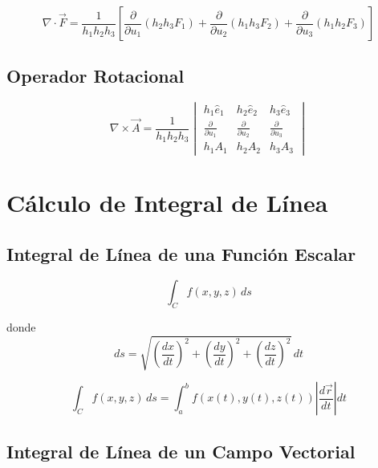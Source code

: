 \documentclass[12pt,a4paper,twocolumn]{article}
\begin{document}
\begin{equation*}
    \nabla \cdot \vec{F} = \frac{1}{h_1 h_2 h_3} \left[ \frac{\partial}{\partial u_1}(h_2 h_3 F_1) + \frac{\partial}{\partial u_2}(h_1 h_3 F_2) + \frac{\partial}{\partial u_3}(h_1 h_2 F_3) \right]
\end{equation*}

\subsection*{Operador Rotacional}

\begin{equation*}
    \nabla \times \vec{A} = \frac{1}{h_1 h_2 h_3}
    \begin{vmatrix}
        h_1 \hat{e}_1                 & h_2 \hat{e}_2                 & h_3 \hat{e}_3                 \\
        \frac{\partial}{\partial u_1} & \frac{\partial}{\partial u_2} & \frac{\partial}{\partial u_3} \\
        h_1 A_1                       & h_2 A_2                       & h_3 A_3
    \end{vmatrix}
\end{equation*}

\section*{Cálculo de Integral de Línea}

\subsection*{Integral de Línea de una Función Escalar}

\begin{equation*}
    \int_C f(x, y, z) \, ds
\end{equation*}

donde
\begin{equation*}
    ds = \sqrt{\left(\frac{dx}{dt}\right)^2 + \left(\frac{dy}{dt}\right)^2 + \left(\frac{dz}{dt}\right)^2} \, dt
\end{equation*}

\begin{equation*}
    \int_C f(x, y, z) \, ds = \int_a^b f(x(t), y(t), z(t)) \left| \frac{d\vec{r}}{dt} \right| dt
\end{equation*}

\subsection*{Integral de Línea de un Campo Vectorial}
\end{document}
